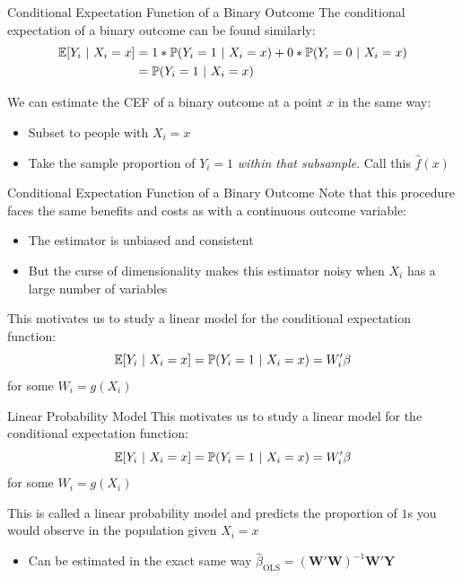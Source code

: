 \documentclass[aspectratio=169,t,11pt,table]{beamer}
\begin{document}
\begin{frame}{Conditional Expectation Function of a Binary Outcome}
  The conditional expectation of a binary outcome can be found similarly:
  \begin{align*}
    \expec{Y_i}{X_i = x} &= 
    1 * \prob{Y_i = 1}{X_i = x} + 0 * \prob{Y_i = 0}{X_i = x} \\
    &= \prob{Y_i = 1}{X_i = x}
  \end{align*}
  
  \bigskip
  We can estimate the CEF of a binary outcome at a point $x$ in the same way:
  \begin{itemize}
    \item Subset to people with $X_i = x$
    \item Take the sample proportion of $Y_i = 1$ \emph{within that subsample}. Call this $\hat{f}(x)$
  \end{itemize}
\end{frame}

\begin{frame}{Conditional Expectation Function of a Binary Outcome}
  Note that this procedure faces the same benefits and costs as with a continuous outcome variable:
  \begin{itemize}
    \item The estimator is unbiased and consistent 
    
    \item But the curse of dimensionality makes this estimator noisy when $X_i$ has a large number of variables
  \end{itemize}
  
  \pause
  \bigskip
  This motivates us to study a linear model for the conditional expectation function:
  $$
    \expec{Y_i}{X_i = x} = \prob{Y_i = 1}{X_i = x} = W_i' \beta
  $$
  for some $W_i = g(X_i)$
\end{frame}

\begin{frame}{Linear Probability Model}
  This motivates us to study a linear model for the conditional expectation function:
  $$
    \expec{Y_i}{X_i = x} = \prob{Y_i = 1}{X_i = x} = W_i' \beta
  $$
  for some $W_i = g(X_i)$

  \bigskip\bigskip
  This is called a \alert{linear probability model} and predicts the proportion of $1$s you would observe in the population given $X_i = x$
  \begin{itemize}
    \item Can be estimated in the exact same way $\hat{\beta}_{\text{OLS}} = \left( \bm{W}' \bm{W} \right)^{-1} \bm{W}' \bm{Y}$
  \end{itemize}
\end{frame}
\end{document}
